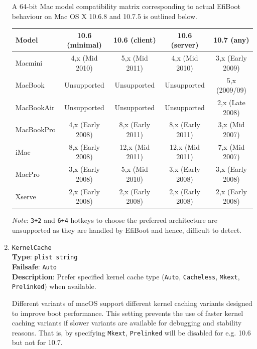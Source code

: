 \documentclass[]{article}
\begin{document}
\begin{enumerate}
  A 64-bit Mac model compatibility matrix corresponding to actual
  EfiBoot behaviour on Mac OS X 10.6.8 and 10.7.5 is outlined below.

  \begin{center}
  \begin{tabular}{|p{0.9in}|c|c|c|c|}
  \hline
  \textbf{Model} & \textbf{10.6 (minimal)} & \textbf{10.6 (client)} & \textbf{10.6 (server)} & \textbf{10.7 (any)} \\
  \hline
  Macmini & 4,x (Mid 2010) & 5,x (Mid 2011) & 4,x (Mid 2010) & 3,x (Early 2009) \\
  \hline
  MacBook & Unsupported & Unsupported & Unsupported & 5,x (2009/09) \\
  \hline
  MacBookAir & Unsupported & Unsupported & Unsupported & 2,x (Late 2008) \\
  \hline
  MacBookPro & 4,x (Early 2008) & 8,x (Early 2011) & 8,x (Early 2011) & 3,x (Mid 2007) \\
  \hline
  iMac & 8,x (Early 2008) & 12,x (Mid 2011) & 12,x (Mid 2011) & 7,x (Mid 2007) \\
  \hline
  MacPro & 3,x (Early 2008) & 5,x (Mid 2010) & 3,x (Early 2008) & 3,x (Early 2008) \\
  \hline
  Xserve & 2,x (Early 2008) & 2,x (Early 2008) & 2,x (Early 2008) & 2,x (Early 2008) \\
  \hline
  \end{tabular}
  \end{center}

  \emph{Note}: \texttt{3+2} and \texttt{6+4} hotkeys to choose the preferred architecture
  are unsupported as they are handled by EfiBoot and hence, difficult to detect.

\item
  \texttt{KernelCache}\\
  \textbf{Type}: \texttt{plist\ string}\\
  \textbf{Failsafe}: \texttt{Auto}\\
  \textbf{Description}: Prefer specified kernel cache type (\texttt{Auto}, \texttt{Cacheless},
  \texttt{Mkext}, \texttt{Prelinked}) when available.

  Different variants of macOS support different kernel caching variants designed to improve
  boot performance. This setting prevents the use of faster kernel caching variants
  if slower variants are available for debugging and stability reasons. That is, by
  specifying \texttt{Mkext}, \texttt{Prelinked} will be disabled for e.g. 10.6 but not for 10.7.


\end{enumerate}
\end{document}
